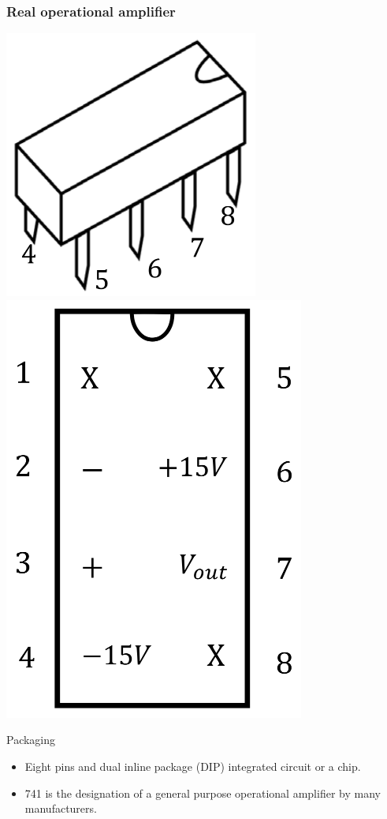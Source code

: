 \documentclass[11pt]{article}
\begin{document}
\subsubsection{Real operational amplifier}
\label{sec:orga03e8cf}
\begin{center}
\includegraphics[height=0.4\textwidth]{./images/real-operational-amplifier-side-view.png}
\includegraphics[height=0.4\textwidth]{./images/real-operational-amplifier-top-view.png}
\end{center}

Packaging
\begin{itemize}
\item Eight pins and dual inline package (DIP) integrated circuit or a chip.
\item 741 is the designation of a general purpose operational amplifier by many manufacturers.
\end{itemize}
\end{document}
